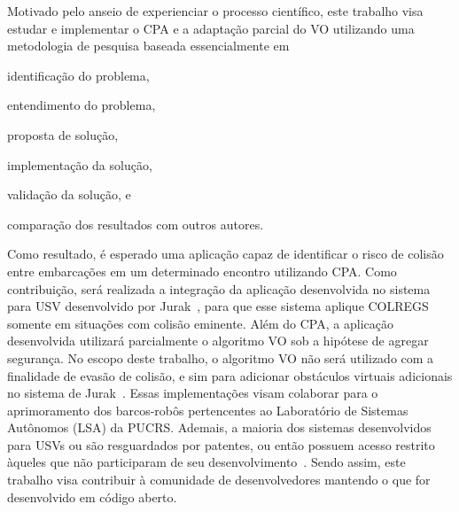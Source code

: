  Motivado pelo anseio de experienciar o processo científico, este trabalho visa estudar e implementar o CPA e a adaptação parcial do VO utilizando uma metodologia de pesquisa baseada essencialmente em 
    \begin{enumerate*}[label=\alph*)]
        \item identificação do problema,
        \item entendimento do problema,
        \item proposta de solução,
        \item implementação da solução,
        \item validação da solução, e
        \item comparação dos resultados com outros autores.
    \end{enumerate*}
    Como resultado, é esperado uma aplicação capaz de identificar o risco de colisão entre embarcações em um determinado encontro utilizando CPA. Como contribuição, será realizada a integração da aplicação desenvolvida no sistema para USV desenvolvido por Jurak~\cite{JURAK2020}, para que esse sistema aplique COLREGS somente em situações com colisão eminente. Além do CPA, a aplicação desenvolvida utilizará parcialmente o algoritmo VO sob a hipótese de agregar segurança. No escopo deste trabalho, o algoritmo VO não será utilizado com a finalidade de evasão de colisão, e sim para adicionar obstáculos virtuais adicionais no sistema de Jurak~\cite{JURAK2020}. Essas implementações visam colaborar para o aprimoramento dos barcos-robôs pertencentes ao Laboratório de Sistemas Autônomos (LSA) da PUCRS. Ademais, a maioria dos sistemas desenvolvidos para USVs ou são resguardados por patentes, ou então possuem acesso restrito àqueles que não participaram de seu desenvolvimento~\cite{JURAK2020}. Sendo assim, este trabalho visa contribuir à comunidade de desenvolvedores mantendo o que for desenvolvido em código aberto. 
    
